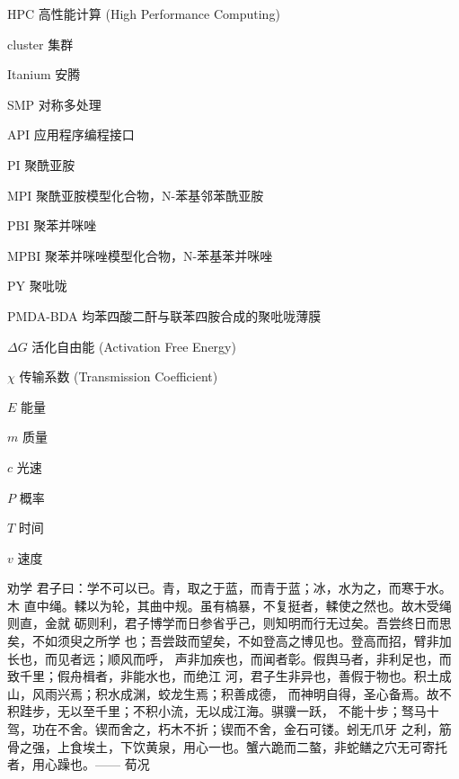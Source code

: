 \begin{denotation}[3cm]
\item[HPC] 高性能计算 (High Performance Computing)
\item[cluster] 集群
\item[Itanium] 安腾
\item[SMP] 对称多处理
\item[API] 应用程序编程接口
\item[PI] 聚酰亚胺
\item[MPI] 聚酰亚胺模型化合物，N-苯基邻苯酰亚胺
\item[PBI] 聚苯并咪唑
\item[MPBI] 聚苯并咪唑模型化合物，N-苯基苯并咪唑
\item[PY] 聚吡咙
\item[PMDA-BDA]	均苯四酸二酐与联苯四胺合成的聚吡咙薄膜
\item[$\Delta G$] 活化自由能 (Activation Free Energy)
\item [$\chi$] 传输系数 (Transmission Coefficient)
\item[$E$] 能量
\item[$m$] 质量
\item[$c$] 光速
\item[$P$] 概率
\item[$T$] 时间
\item[$v$] 速度
\item[劝学] 君子曰：学不可以已。青，取之于蓝，而青于蓝；冰，水为之，而寒于水。木
  直中绳。輮以为轮，其曲中规。虽有槁暴，不复挺者，輮使之然也。故木受绳则直，金就
  砺则利，君子博学而日参省乎己，则知明而行无过矣。吾尝终日而思矣，不如须臾之所学
  也；吾尝跂而望矣，不如登高之博见也。登高而招，臂非加长也，而见者远；顺风而呼，
  声非加疾也，而闻者彰。假舆马者，非利足也，而致千里；假舟楫者，非能水也，而绝江
  河，君子生非异也，善假于物也。积土成山，风雨兴焉；积水成渊，蛟龙生焉；积善成德，
  而神明自得，圣心备焉。故不积跬步，无以至千里；不积小流，无以成江海。骐骥一跃，
  不能十步；驽马十驾，功在不舍。锲而舍之，朽木不折；锲而不舍，金石可镂。蚓无爪牙
  之利，筋骨之强，上食埃土，下饮黄泉，用心一也。蟹六跪而二螯，非蛇鳝之穴无可寄托
  者，用心躁也。—— 荀况
\end{denotation}
